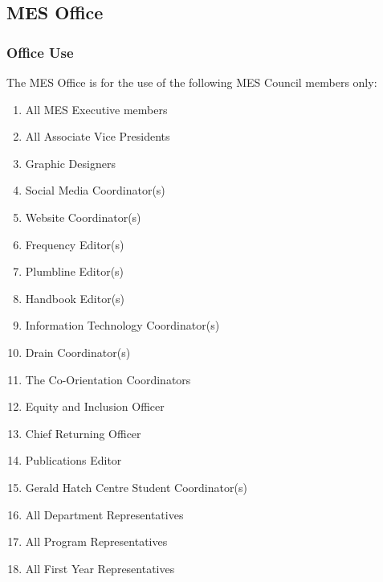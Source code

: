 \hypertarget{mes-office}{%
 \subsection{MES Office}
 \label{mes-office}}

\hypertarget{office-use}{%
 \subsubsection{Office Use}
 \label{office-use}}

The MES Office is for the use of the following MES Council members only:

\begin{enumerate}
 \item
  All MES Executive members
 \item
  All Associate Vice Presidents
 \item
  Graphic Designers
 \item
  Social Media Coordinator(s)
 \item
  Website Coordinator(s)
 \item
  Frequency Editor(s)
 \item
  Plumbline Editor(s)
 \item
  Handbook Editor(s)
 \item
  Information Technology Coordinator(s)
 \item
  Drain Coordinator(s)
 \item
  The Co-Orientation Coordinators
 \item
  Equity and Inclusion Officer
 \item
  Chief Returning Officer
 \item
  Publications Editor
 \item
  Gerald Hatch Centre Student Coordinator(s)
 \item
  All Department Representatives
 \item
  All Program Representatives
 \item
  All First Year Representatives
\end{enumerate}

